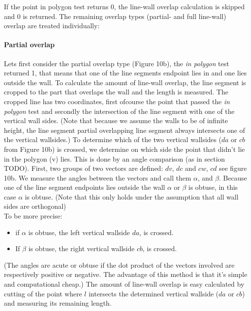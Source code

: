 \documentclass[10pt]{article}
\begin{document}
	If the point in polygon test returns 0, the line-wall overlap calculation
	is skipped and 0 is returned. The remaining overlap types (partial- and full
	line-wall) overlap are treated individually:\\




	\paragraph{Partial overlap}
	Lets first consider the partial overlap type (Figure 10b), the \emph{in polygon} test
	returned 1, that means that one of the line segments endpoint lies in
	and one lies outside the wall.
	To calculate the amount of line-wall overlap, the line segment is cropped to the
	part that overlaps the wall and the length is measured. 
	The cropped line has two coordinates, first ofcourse the point that passed
	the \emph{in polygon} test and secondly the intersection of the line
	segment with one of the vertical wall sides.
	(Note that because we assume the walls to be of infinite height, the line
	segment partial overlapping line segment always intersects one of the
	vertical wallsides.)
	To determine which of the two vertical wallsides ($da$ or $cb$ from Figure 10b)
	 is crossed, we determine on which side the point that didn't lie in the polygon (v) lies.
	This is done by an angle comparison (as in section TODO).
	First, two groups of two vectors are defined: $dv$, $dc$ and $cw$, $cd$ see figure 10b.
	We measure the angles between the vectors and call them $\alpha$, and
	$\beta$. 
	Because one of the line segment endpoints lies outside
	the wall $\alpha$ or $\beta$ is obtuse, in this case $\alpha$ is obtuse.
	(Note that this only holds under the assumption that all wall sides are orthogonal)\\
	To be more precise: 
	\begin{itemize}
	\item if $\alpha$ is obtuse, the left vertical wallside $da$, is
	crossed. \\
	\item If $\beta$ is obtuse, the right vertical wallside $cb$, is
	crossed. \\
	\end{itemize}
	(The angles are acute or obtuse if the dot product of the vectors involved
	are respectively positive or negative. The advantage of this method is that
	it's simple and computational cheap.)
	The amount of line-wall overlap is easy calculated by cutting of the
	point where $l$ intersects the determined vertical wallside ($da$ or
	$cb$) and measuring its remaining length.
\end{document}
